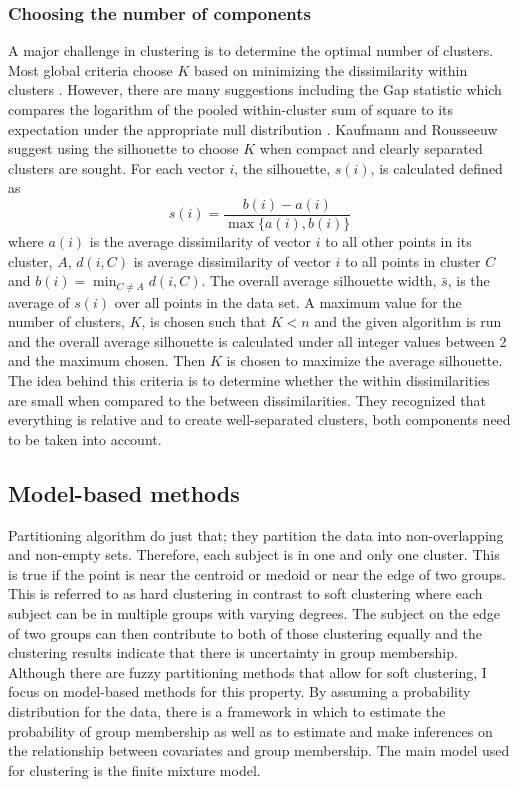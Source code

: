 \subsubsection{Choosing the number of components}
A major challenge in clustering is to determine the optimal number of clusters. Most global criteria choose $K$ based on minimizing the dissimilarity within clusters \cite{gordon1999}. However, there are many suggestions including the Gap statistic which compares the logarithm of the pooled within-cluster sum of square to its expectation under the appropriate null distribution \cite{tibshirani2001}. Kaufmann and Rousseeuw suggest using the silhouette to choose $K$ \cite{kaufmann1990} when compact and clearly separated clusters are sought. For each vector $i$, the silhouette, $s(i)$, is calculated defined as
$$s(i)=\frac{b(i)-a(i)}{\max\{a(i),b(i)\}}$$
where $a(i)$ is the average dissimilarity of  vector $i$ to all other points in its cluster, $A$, $d(i,C)$ is average dissimilarity of vector $i$ to all points in cluster $C$ and $b(i)=\min_{C\not= A} d(i,C)$. The overall average silhouette width, $\bar{s}$, is the average of $s(i)$ over all points in the data set. A maximum value for the number of clusters, $K$, is chosen such that $K<n$ and the given algorithm is run and the overall average silhouette is calculated under all integer values between 2 and the maximum chosen. Then $K$ is chosen to maximize the average silhouette. The idea behind this criteria is to determine whether the within dissimilarities are small when compared to the between dissimilarities. They recognized that everything is relative and to create well-separated clusters, both components need to be taken into account.

\subsection{Model-based methods}
Partitioning algorithm do just that; they partition the data into non-overlapping and non-empty sets. Therefore, each subject is in one and only one cluster. This is true if the point is near the centroid or medoid or near the edge of two groups. This is referred to as hard clustering in contrast to soft clustering where each subject can be in multiple groups with varying degrees. The subject on the edge of two groups can then contribute to both of those clustering equally and the clustering results indicate that there is uncertainty in group membership. Although there are fuzzy partitioning methods that allow for soft clustering, I focus on model-based methods for this property. By assuming a probability distribution for the data, there is a framework in which to estimate the probability of group membership as well as to estimate and make inferences on the relationship between covariates and group membership. The main model used for clustering is the finite mixture model. 

